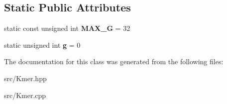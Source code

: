 \subsection*{Static Public Attributes}
\begin{DoxyCompactItemize}
\item 
\mbox{\label{classMinimizer_a347a939077def0cb6ea48b79403b58f4}} 
static const unsigned int {\bfseries M\+A\+X\+\_\+G} = 32
\item 
\mbox{\label{classMinimizer_a1fefeda1a73186e0a36482fc74f5693e}} 
static unsigned int {\bfseries g} = 0
\end{DoxyCompactItemize}


The documentation for this class was generated from the following files\+:\begin{DoxyCompactItemize}
\item 
src/Kmer.\+hpp\item 
src/Kmer.\+cpp\end{DoxyCompactItemize}

